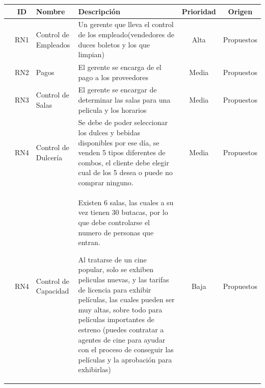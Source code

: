 \documentclass[12pt, fleqn]{report}                             %
\begin{document}
            \begin{tabular}{r ||c |m{7em} | m{15em} |c |c }
               &  ID & Nombre & Descripción & Prioridad & Origen \\ [0.5ex] 
               \hline\hline
              
                & RN1   & Control de Empleados                  &
                Un gerente que lleva el control de los empleado(vendedores de duces boletos y los que limpian)
                & Alta  & Propuestos\\

                & RN2   & Pagos                                 &
                El gerente se encarga de el pago a los proveedores
                & Media  & Propuestos\\

                & RN3   & Control de Salas                      &
                El gerente se encargar de determinar las salas para una pelicula y los horarios
                & Media  & Propuestos\\


                & RN4   & Control de Dulcería                   &
                Se debe de poder seleccionar los dulces y bebidas disponibles por ese día, 
                se venden 5 tipos diferentes de combos, el cliente debe elegir cual de los
                5 desea o puede no comprar ninguno.
                & Media  & Propuestos\\

                & RN4   & Control de Capacidad                   &
                Existen 6 salas, las cuales a su vez tienen 30 butacas, por lo que debe controlarse el numero
                de personas que entran.

                Al tratarse de un cine popular, solo se exhiben peliculas nuevas, y las tarifas de licencia
                para exhibir películas, las cuales pueden ser muy altas, sobre todo para películas importantes
                de estreno (puedes contratar a agentes de cine para ayudar con el proceso de conseguir las
                películas y la aprobación para exhibirlas)
                & Baja  & Propuestos\\

            \end{tabular}


        \clearpage
\end{document}
